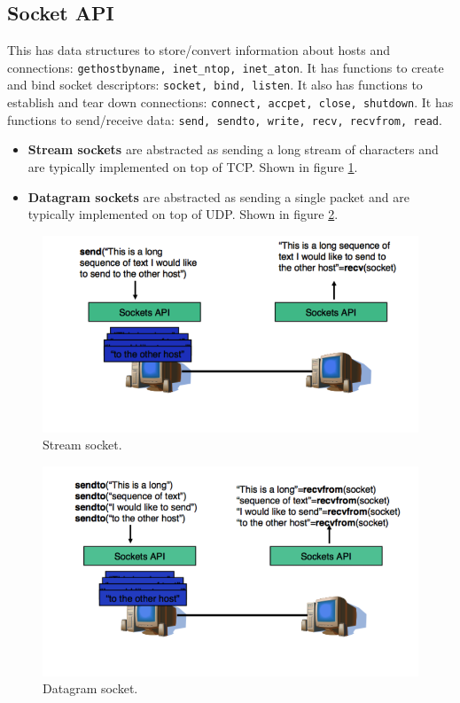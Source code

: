 \documentclass[twoside]{article}
\begin{document}
\subsection{Socket API}
This has data structures to store/convert information about hosts and 
connections: \texttt{gethostbyname, inet\_ntop, inet\_aton}. It has functions
to create and bind socket descriptors: \texttt{socket, bind, listen}. It also 
has functions to establish and tear down connections: \texttt{connect, accpet,
close, shutdown}. It has functions to send/receive data: \texttt{send, 
sendto, write, recv, recvfrom, read}.
\begin{itemize}
    \item \textbf{Stream sockets} are abstracted as sending a long stream of 
    characters and are typically implemented on top of TCP. Shown in figure
    \ref{fig:stream-socket}.
    \item \textbf{Datagram sockets} are abstracted as sending a single packet
    and are typically implemented on top of UDP. Shown in figure \ref{fig:datagram-socket}.
\end{itemize}
\begin{figure}
  \includegraphics[width=\linewidth]{stream-socket.png}
  \caption{Stream socket.}
  \label{fig:stream-socket}
\end{figure}
\begin{figure}
  \includegraphics[width=\linewidth]{datagram-socket.png}
  \caption{Datagram socket.}
  \label{fig:datagram-socket}
\end{figure}
\end{document}
